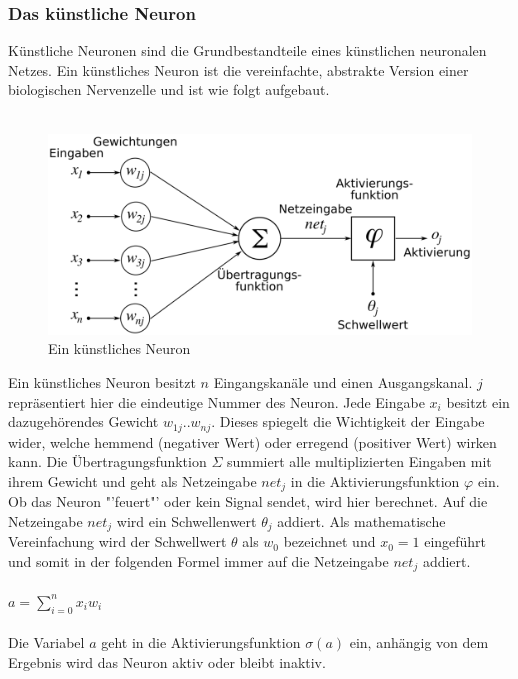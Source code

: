 \documentclass[12pt,oneside,a4paper,parskip]{scrbook}
\begin{document}
\subsubsection{Das künstliche Neuron}
Künstliche Neuronen sind die Grundbestandteile eines künstlichen neuronalen Netzes.
Ein künstliches Neuron ist die vereinfachte, abstrakte Version einer biologischen Nervenzelle und ist wie folgt aufgebaut.\\\\
\begin{figure}[h]
	\begin{center}
		\includegraphics[width=12cm]{Bilder/ArtificialNeuronModel_deutsch.png}
		\caption{Ein künstliches Neuron}
		\label{fig:wikiNeuron}
	\end{center}
\end{figure}
Ein künstliches Neuron besitzt $n$ Eingangskanäle und einen Ausgangskanal. $j$ repräsentiert hier die eindeutige Nummer des Neuron. Jede Eingabe $x_{i}$ besitzt ein dazugehörendes Gewicht $w_{1j}..w_{nj}$. Dieses spiegelt die Wichtigkeit der Eingabe wider, welche hemmend (negativer Wert) oder erregend (positiver Wert) wirken kann. Die Übertragungsfunktion $\Sigma$ summiert alle multiplizierten Eingaben mit ihrem Gewicht und geht als Netzeingabe $net_j$ in die Aktivierungsfunktion $\varphi$ ein. \\
Ob das Neuron "'feuert"' oder kein Signal sendet, wird hier berechnet. Auf die Netzeingabe $net_j$ wird ein Schwellenwert $\theta_j$ addiert. Als mathematische Vereinfachung wird der Schwellwert $\theta$ als $w_0$ bezeichnet und $x_0 = 1$ eingeführt und somit in der folgenden Formel immer auf die Netzeingabe $net_j$ addiert.
\\\\
${\displaystyle a=\sum _{i=0}^{n}x_{i}w_{i}}$
\\\\
Die Variabel $a$ geht in die Aktivierungsfunktion ${\sigma (a)}$ ein, anhängig von dem Ergebnis wird das Neuron aktiv oder bleibt inaktiv.
\end{document}
